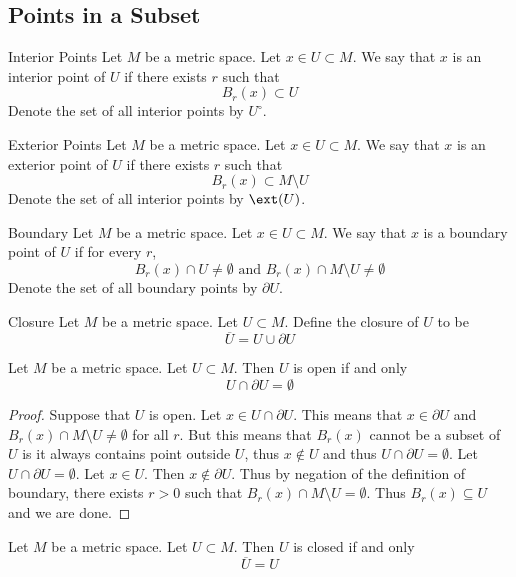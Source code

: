 \subsection{Points in a Subset}
\begin{defn}{Interior Points}{} Let $M$ be a metric space. Let $x\in U\subset M$. We say that $x$ is an interior point of $U$ if there exists $r$ such that $$B_r(x)\subset U$$ Denote the set of all interior points by $U^\circ$. 
\end{defn}

\begin{defn}{Exterior Points}{} Let $M$ be a metric space. Let $x\in U\subset M$. We say that $x$ is an exterior point of $U$ if there exists $r$ such that $$B_r(x)\subset M\setminus U$$ Denote the set of all interior points by $\ext(U)$. 
\end{defn}

\begin{defn}{Boundary}{} Let $M$ be a metric space. Let $x\in U\subset M$. We say that $x$ is a boundary point of $U$ if for every $r$, $$B_r(x)\cap U\neq\emptyset\text{ and }B_r(x)\cap M\setminus U\neq\emptyset$$ Denote the set of all boundary points by $\partial U$. 
\end{defn}

\begin{defn}{Closure}{} Let $M$ be a metric space. Let $U\subset M$. Define the closure of $U$ to be $$\overline{U}=U\cup\partial U$$
\end{defn}

\begin{prp}{}{} Let $M$ be a metric space. Let $U\subset M$. Then $U$ is open if and only $$U\cap\partial U=\emptyset$$ \tcbline
\begin{proof}
Suppose that $U$ is open. Let $x\in U\cap\partial U$. This means that $x\in\partial U$ and $B_r(x)\cap M\setminus U\neq\emptyset$ for all $r$. But this means that $B_r(x)$ cannot be a subset of $U$ is it always contains point outside $U$, thus $x\notin U$ and thus $U\cap\partial U=\emptyset$. \linebreak\linebreak
Let $U\cap\partial U=\emptyset$. Let $x\in U$. Then $x\notin\partial U$. Thus by negation of the definition of boundary, there exists $r>0$ such that $B_r(x)\cap M\setminus U=\emptyset$. Thus $B_r(x)\subseteq U$ and we are done. 
\end{proof}
\end{prp}

\begin{prp}{}{} Let $M$ be a metric space. Let $U\subset M$. Then $U$ is closed if and only $$\overline{U}=U$$
\end{prp}

